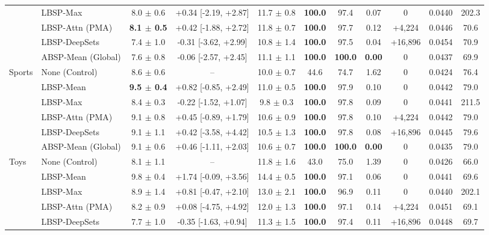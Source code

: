\begin{table}[!htbp]
\begin{tabular*}{\textwidth}{@{\extracolsep{\fill}}llccccccccc@{}}
 & LBSP-Max & 8.0 $\pm$ 0.6 & +0.34 \scriptsize{[-2.19, +2.87]} & 11.7 $\pm$ 0.8 & \textbf{100.0} & 97.4 & 0.07 & 0 & 0.0440 & 202.3 \\
 & LBSP-Attn (PMA) & \textbf{8.1 $\pm$ 0.5} & +0.42 \scriptsize{[-1.88, +2.72]} & 11.8 $\pm$ 0.7 & \textbf{100.0} & 97.7 & 0.12 & +4,224 & 0.0446 & 70.6 \\
 & LBSP-DeepSets & 7.4 $\pm$ 1.0 & -0.31 \scriptsize{[-3.62, +2.99]} & 10.8 $\pm$ 1.4 & \textbf{100.0} & 97.5 & 0.04 & +16,896 & 0.0454 & 70.9 \\
 & ABSP-Mean (Global) & 7.6 $\pm$ 0.8 & -0.06 \scriptsize{[-2.57, +2.45]} & 11.1 $\pm$ 1.1 & \textbf{100.0} & \textbf{100.0} & \textbf{0.00} & 0 & 0.0437 & 69.9 \\
\midrule
Sports & None (Control) & 8.6 $\pm$ 0.6 & -- & 10.0 $\pm$ 0.7 & 44.6 & 74.7 & 1.62 & 0 & 0.0424 & 76.4 \\
 & LBSP-Mean & \textbf{9.5 $\pm$ 0.4} & +0.82 \scriptsize{[-0.85, +2.49]} & 11.0 $\pm$ 0.5 & \textbf{100.0} & 97.9 & 0.10 & 0 & 0.0442 & 79.0 \\
 & LBSP-Max & 8.4 $\pm$ 0.3 & -0.22 \scriptsize{[-1.52, +1.07]} & 9.8 $\pm$ 0.3 & \textbf{100.0} & 97.8 & 0.09 & 0 & 0.0441 & 211.5 \\
 & LBSP-Attn (PMA) & 9.1 $\pm$ 0.8 & +0.45 \scriptsize{[-0.89, +1.79]} & 10.6 $\pm$ 0.9 & \textbf{100.0} & 97.8 & 0.10 & +4,224 & 0.0442 & 79.0 \\
 & LBSP-DeepSets & 9.1 $\pm$ 1.1 & +0.42 \scriptsize{[-3.58, +4.42]} & 10.5 $\pm$ 1.3 & \textbf{100.0} & 97.8 & 0.08 & +16,896 & 0.0445 & 79.6 \\
 & ABSP-Mean (Global) & 9.1 $\pm$ 0.6 & +0.46 \scriptsize{[-1.11, +2.03]} & 10.6 $\pm$ 0.7 & \textbf{100.0} & \textbf{100.0} & \textbf{0.00} & 0 & 0.0435 & 79.0 \\
\midrule
Toys & None (Control) & 8.1 $\pm$ 1.1 & -- & 11.8 $\pm$ 1.6 & 43.0 & 75.0 & 1.39 & 0 & 0.0426 & 66.0 \\
 & LBSP-Mean & 9.8 $\pm$ 0.4 & +1.74 \scriptsize{[-0.09, +3.56]} & 14.4 $\pm$ 0.5 & \textbf{100.0} & 97.1 & 0.06 & 0 & 0.0441 & 69.6 \\
 & LBSP-Max & 8.9 $\pm$ 1.4 & +0.81 \scriptsize{[-0.47, +2.10]} & 13.0 $\pm$ 2.1 & \textbf{100.0} & 96.9 & 0.11 & 0 & 0.0440 & 202.1 \\
 & LBSP-Attn (PMA) & 8.2 $\pm$ 0.9 & +0.08 \scriptsize{[-4.75, +4.92]} & 12.0 $\pm$ 1.3 & \textbf{100.0} & 97.1 & 0.14 & +4,224 & 0.0451 & 69.1 \\
 & LBSP-DeepSets & 7.7 $\pm$ 1.0 & -0.35 \scriptsize{[-1.63, +0.94]} & 11.3 $\pm$ 1.5 & \textbf{100.0} & 97.4 & 0.11 & +16,896 & 0.0448 & 69.7 \\

\end{tabular*}
\end{table}
